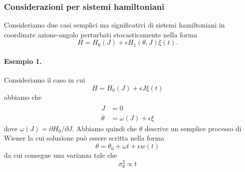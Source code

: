 \documentclass[10pt,a4paper]{article}
\begin{document}
\subsubsection{Considerazioni per sistemi hamiltoniani}
Consideriamo due casi semplici ma significativi di sistemi hamiltoniani in coordinate azione-angolo perturbati stocasticamente nella forma
\begin{equation}
	H = H_0(J) + \epsilon H_1(\theta, J)\xi(t).
\end{equation}
\paragraph{Esempio 1.}
Consideriamo il caso in cui
\begin{equation}
	H = H_0(J) + \epsilon J \xi(t) 
\end{equation}
abbiamo che
\begin{align}
	\dot{J} &= 0 \\
	\dot{\theta} &= \omega(J) + \epsilon\xi
\end{align}
dove \(\omega(J) = \partial H_0/\partial J\). Abbiamo quindi che \(\theta\) descrive un semplice processo di Wiener la cui soluzione può essere scritta nella forma
\begin{equation}
	\theta = \theta_0 + \omega t + \epsilon w(t)
\end{equation}
da cui consegue una varianza tale che
\begin{equation}
	\sigma_{\theta}^2 \propto t
\end{equation}
\end{document}
